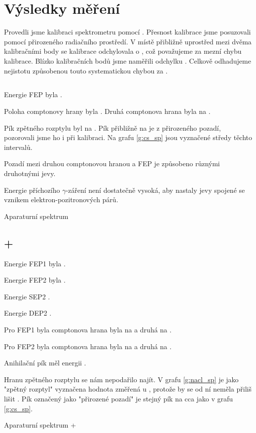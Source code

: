 \section*{Výsledky měření}
Provedli jsme kalibraci spektrometru pomocí . Přesnost kalibrace jsme posuzovali pomocí přirozeného radiačního prostředí. V místě přibližně uprostřed mezi dvěma kalibračními body se kalibrace odchylovala o , což považujeme za mezní chybu kalibrace. Blízko kalibračních bodů jsme naměřili odchylku . Celkově odhadujeme nejistotu způsobenou touto systematickou chybou za .



\subsection*{}
Energie FEP byla  .

Poloha comptonovy hrany byla . Druhá comptonova hrana byla na . 

Pík zpětného rozptylu byl na . Pík přibližně na  je z přirozeného pozadí, pozorovali jsme ho i při kalibraci. Na grafu \ref{g:cs_sp} jsou vyznačené středy těchto intervalů.

Pozadí mezi druhou comptonovou hranou a FEP je způsobeno různými druhotnými jevy.


Energie příchozího $\gamma$-záření není dostatečně vysoká, aby nastaly jevy spojené se vznikem elektron-pozitronových párů.
\begin{graph}[htbp] 
\centering

\caption{Aparaturní spektrum }
\label{g:cs_sp}
\end{graph}

\subsection*{+}
Energie FEP1 byla  . 

Energie FEP2 byla  . 

Energie SEP2  . 

Energie DEP2  .

Pro FEP1 byla comptonova hrana byla na  a druhá na .

Pro FEP2 byla comptonova hrana byla na  a druhá na .

Anihilační pík měl energii  .

Hranu zpětného rozptylu se nám nepodařilo najít. V grafu \ref{g:nacl_sp} je jako "zpětný rozptyl" vyznačena hodnota změřená u , protože by se od ní neměla přiliš lišit \cite{skripta}. Pík označený jako "přirozené pozadí" je stejný pík na cca  jako v grafu \ref{g:cs_sp}.

\begin{graph}[htbp] 
\centering

\caption{Aparaturní spektrum +}
\label{g:nacl_sp}
\end{graph}